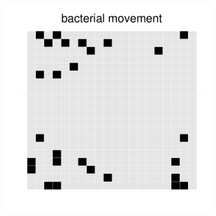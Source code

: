 \begin{figure}[h!]
{\begin{minipage}[t]{0.3\textwidth}
  \end{minipage}
  \begin{minipage}[t]{0.3\textwidth}
    \includegraphics[width=\textwidth]{../results/Bcoli_20x20_seed176_bac50.pdf}
  \end{minipage}
  }
\end{figure}

